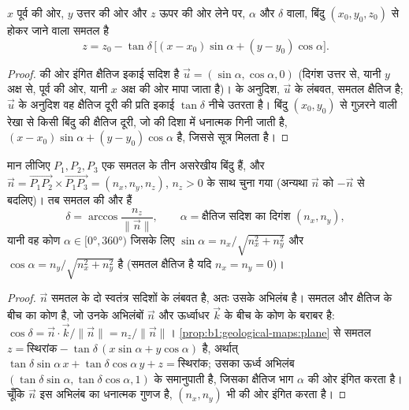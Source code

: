 \begin{proposition}\label{prop:b1:geological-maps:plane}
$x$ पूर्व की ओर, $y$ उत्तर की ओर और $z$ ऊपर की ओर लेने पर,  $\alpha$ और  $\delta$ वाला, बिंदु $(x_0, y_0, z_0)$ से होकर जाने वाला समतल है
\[
  z = z_0 - \tan\delta\,\bigl[(x - x_0)\sin\alpha + (y - y_0)\cos\alpha\bigr].
\]
\end{proposition}

\begin{proof}
 की ओर इंगित क्षैतिज इकाई सदिश है $\vec u = (\sin\alpha, \cos\alpha, 0)$ (दिगंश उत्तर से, यानी
$y$ अक्ष से, पूर्व की ओर, यानी $x$ अक्ष की ओर मापा जाता है)।  के अनुदिश, $\vec u$ के लंबवत, समतल
क्षैतिज है; $\vec u$ के अनुदिश वह क्षैतिज दूरी की प्रति इकाई $\tan\delta$ नीचे उतरता है। बिंदु $(x_0, y_0)$
से गुज़रने वाली  रेखा से किसी बिंदु की क्षैतिज दूरी, जो  की दिशा में धनात्मक गिनी जाती है, $(x-x_0)\sin\alpha + (y-y_0)\cos\alpha$ है, जिससे सूत्र मिलता है।
\end{proof}

\begin{theorem}[तीन बिंदुओं से अभिविन्यास]\label{thm:b1:geological-maps:three-point}
मान लीजिए $P_1, P_2, P_3$ एक समतल के तीन असरेखीय बिंदु हैं, और
$\vec n = \overrightarrow{P_1P_2} \times \overrightarrow{P_1P_3} =
(n_x, n_y, n_z)$, $n_z > 0$ के साथ चुना गया (अन्यथा $\vec n$ को $-\vec n$ से बदलिए)। तब समतल की  और
 हैं
\[
  \delta = \arccos\frac{n_z}{\|\vec n\|}, \qquad
  \alpha = \text{क्षैतिज सदिश का दिगंश } (n_x, n_y),
\]
यानी वह कोण $\alpha \in [\ang{0}, \ang{360})$ जिसके लिए
$\sin\alpha = n_x/\sqrt{n_x^2+n_y^2}$ और $\cos\alpha = n_y/\sqrt{n_x^2+n_y^2}$ है (समतल क्षैतिज है यदि
$n_x = n_y = 0$)।
\end{theorem}

\begin{proof}
$\vec n$ समतल के दो स्वतंत्र सदिशों के लंबवत है, अतः उसके अभिलंब है।  समतल और क्षैतिज के बीच का कोण है,
जो उनके अभिलंबों $\vec n$ और ऊर्ध्वाधर $\vec k$ के बीच के कोण के बराबर है: $\cos\delta = \vec n \cdot \vec k / \|\vec n\| = n_z/\|\vec n\|$। \cref{prop:b1:geological-maps:plane} से समतल
$z = \text{स्थिरांक} -
\tan\delta\,(x\sin\alpha + y\cos\alpha)$ है, अर्थात्
$\tan\delta\sin\alpha\,x + \tan\delta\cos\alpha\,y + z = \text{स्थिरांक}$; उसका ऊर्ध्व अभिलंब $(\tan\delta\sin\alpha,
\tan\delta\cos\alpha, 1)$ के समानुपाती है, जिसका क्षैतिज भाग  $\alpha$ की ओर इंगित करता है। चूँकि $\vec n$ इस
अभिलंब का धनात्मक गुणज है, $(n_x, n_y)$ भी  की ओर इंगित करता है।
\end{proof}

